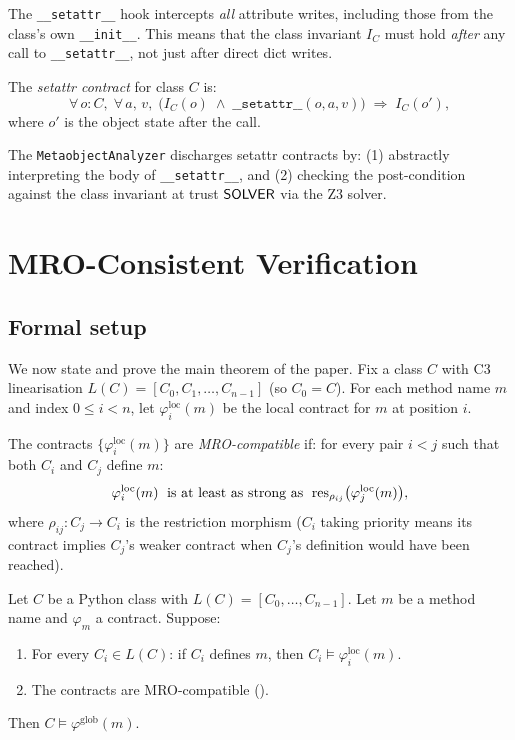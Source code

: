 \documentclass[11pt]{article}
\newcommand{\Clin}[1]{L(#1)}                     %
\newcommand{\setattr}{\texttt{\_\_setattr\_\_}}
\newcommand{\LocalContr}[1]{\varphi_{#1}^{\mathrm{loc}}}
\newcommand{\GlobalContr}[1]{\varphi_{#1}^{\mathrm{glob}}}
\newcommand{\ContractSat}{\models}
\newcommand{\MetaAnalyzer}{\texttt{MetaobjectAnalyzer}}
\begin{document}
The \setattr{} hook intercepts \emph{all} attribute writes, including
those from the class's own \texttt{\_\_init\_\_}.  This means that the
class invariant $I_C$ must hold \emph{after} any call to \setattr,
not just after direct dict writes.

\begin{definition}\label{def:setattr-contract}
  The \emph{setattr contract} for class $C$ is:
  \[
    \forall\, o : C,\; \forall\, a,\, v,\;
    \bigl(I_C(o) \;\wedge\; \texttt{\_\_setattr\_\_}(o, a, v)\bigr)
    \;\Rightarrow\; I_C(o'),
  \]
  where $o'$ is the object state after the call.
\end{definition}

The \MetaAnalyzer{} discharges setattr contracts by:
(1) abstractly interpreting the body of \setattr, and
(2) checking the post-condition against the class invariant at
    trust $\mathsf{SOLVER}$ via the Z3 solver.

\section{MRO-Consistent Verification}\label{sec:thm}

\subsection{Formal setup}

We now state and prove the main theorem of the paper.  Fix a class $C$
with C3 linearisation $\Clin{C} = [C_0, C_1, \ldots, C_{n-1}]$
(so $C_0 = C$).  For each method name $m$ and index $0 \le i < n$,
let $\LocalContr{i}(m)$ be the local contract for $m$ at position $i$.

\begin{definition}\label{def:compat}
  The contracts $\{\LocalContr{i}(m)\}$ are \emph{MRO-compatible} if:
  for every pair $i < j$ such that both $C_i$ and $C_j$ define $m$:
  \[
    \LocalContr{i}(m) \;\text{ is at least as strong as }\;
    \res_{\rho_{ij}}\bigl(\LocalContr{j}(m)\bigr),
  \]
  where $\rho_{ij}\colon C_j \to C_i$ is the restriction morphism
  (\ie $C_i$ taking priority means its contract implies $C_j$'s weaker
  contract when $C_j$'s definition would have been reached).
\end{definition}

\begin{theorem}\label{thm:mro-consistency}
  Let $C$ be a Python class with $\Clin{C} = [C_0,\ldots,C_{n-1}]$.
  Let $m$ be a method name and $\varphi_m$ a contract.
  Suppose:
  \begin{enumerate}[leftmargin=1.5em,label=(\roman*)]
    \item For every $C_i \in \Clin{C}$: if $C_i$ defines $m$, then
      $C_i \ContractSat \LocalContr{i}(m)$.
    \item The contracts are MRO-compatible
      ().
  \end{enumerate}
  Then $C \ContractSat \GlobalContr{}(m)$.
\end{theorem}
\end{document}
